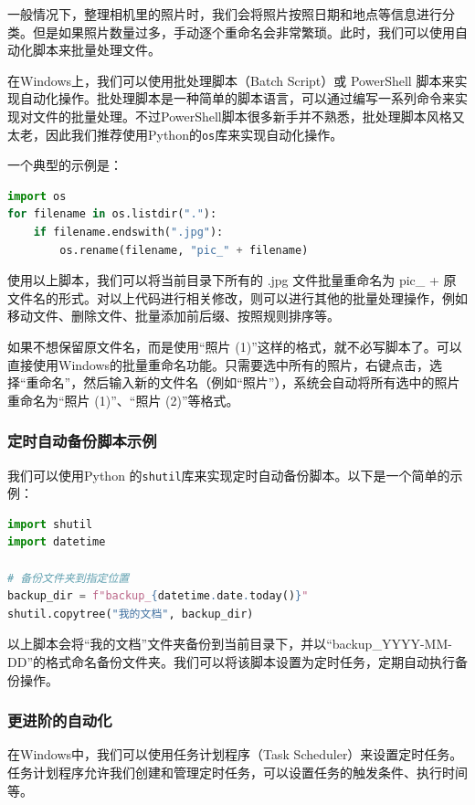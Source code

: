 \documentclass[../main.tex]{subfiles}
\begin{document}
一般情况下，整理相机里的照片时，我们会将照片按照日期和地点等信息进行分类。但是如果照片数量过多，手动逐个重命名会非常繁琐。此时，我们可以使用自动化脚本来批量处理文件。

在Windows上，我们可以使用批处理脚本（Batch Script）或 PowerShell 脚本来实现自动化操作。批处理脚本是一种简单的脚本语言，可以通过编写一系列命令来实现对文件的批量处理。不过PowerShell脚本很多新手并不熟悉，批处理脚本风格又太老，因此我们推荐使用Python的\texttt{os}库来实现自动化操作。

一个典型的示例是：

\begin{lstlisting}[language=python]
import os
for filename in os.listdir("."):  
    if filename.endswith(".jpg"):  
        os.rename(filename, "pic_" + filename)  
\end{lstlisting}

使用以上脚本，我们可以将当前目录下所有的 .jpg 文件批量重命名为 pic\_ + 原文件名的形式。对以上代码进行相关修改，则可以进行其他的批量处理操作，例如移动文件、删除文件、批量添加前后缀、按照规则排序等。

如果不想保留原文件名，而是使用“照片 (1)”这样的格式，就不必写脚本了。可以直接使用Windows的批量重命名功能。只需要选中所有的照片，右键点击，选择“重命名”，然后输入新的文件名（例如“照片”），系统会自动将所有选中的照片重命名为“照片 (1)”、“照片 (2)”等格式。

\subsubsection{定时自动备份脚本示例}

我们可以使用Python 的\texttt{shutil}库来实现定时自动备份脚本。以下是一个简单的示例：
\begin{lstlisting}[language=python]
import shutil  
import datetime  

# 备份文件夹到指定位置  
backup_dir = f"backup_{datetime.date.today()}"  
shutil.copytree("我的文档", backup_dir)  
\end{lstlisting}

以上脚本会将“我的文档”文件夹备份到当前目录下，并以“backup\_YYYY-MM-DD”的格式命名备份文件夹。我们可以将该脚本设置为定时任务，定期自动执行备份操作。

\subsubsection{更进阶的自动化}

在Windows中，我们可以使用任务计划程序（Task Scheduler）来设置定时任务。任务计划程序允许我们创建和管理定时任务，可以设置任务的触发条件、执行时间等。
\end{document}
